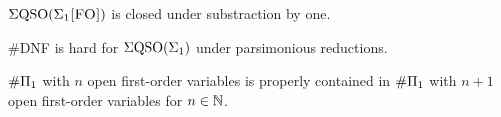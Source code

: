 \begin{theorem} \label{sigmafo-minusone}
	$\Sigma{\rm QSO}(\Sigma_{1}\textsc{[FO]})$ is closed under substraction by one.
\end{theorem}

\begin{theorem} \label{dnf-pars}
	{\sc \#DNF} is hard for $\Sigma{\rm QSO}(\Sigma_{1})$ under parsimonious reductions. 
\end{theorem}

\begin{theorem} \label{nplusone-strict}
	$\#\Pi_{1}$ with $n$ open first-order variables is properly contained in $\#\Pi_{1}$ with $n+1$ open first-order variables for $n\in\mathbb{N}$.  
\end{theorem}